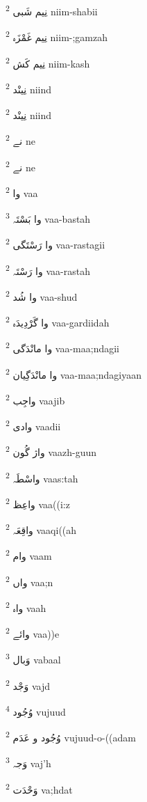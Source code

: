 \documentclass[12pt]{article}
\begin{document}
\begin{multicols}{5}
{\ur نِیم شَبی}   \textsuperscript{2} niim-shabii

{\ur نِیم غَمْزَہ}   \textsuperscript{2} niim-;gamzah

{\ur نِیم کَش}   \textsuperscript{2} niim-kash

{\ur نِینْد}   \textsuperscript{2} niind

{\ur نِینْد}   \textsuperscript{2} niind

{\ur نے}   \textsuperscript{2} ne

{\ur نے}   \textsuperscript{2} ne

{\ur وا}   \textsuperscript{2} vaa

{\ur وا بَسْتَہ}   \textsuperscript{3} vaa-bastah

{\ur وا رَسْتَگی}   \textsuperscript{2} vaa-rastagii

{\ur وا رَسْتَہ}   \textsuperscript{2} vaa-rastah

{\ur وا شُد}   \textsuperscript{2} vaa-shud

{\ur وا گَرْدِیدَہ}   \textsuperscript{2} vaa-gardiidah

{\ur وا مانْدَگی}   \textsuperscript{2} vaa-maa;ndagii

{\ur وا مانْدَگِیان}   \textsuperscript{2} vaa-maa;ndagiyaan

{\ur واجِب}   \textsuperscript{2} vaajib

{\ur وادی}   \textsuperscript{2} vaadii

{\ur واژ گُون}   \textsuperscript{2} vaazh-guun

{\ur واسْطَہ}   \textsuperscript{2} vaas:tah

{\ur واعِظ}   \textsuperscript{2} vaa((i:z

{\ur واقِعَہ}   \textsuperscript{2} vaaqi((ah

{\ur وام}   \textsuperscript{2} vaam

{\ur واں}   \textsuperscript{2} vaa;n

{\ur واہ}   \textsuperscript{2} vaah

{\ur وائے}   \textsuperscript{2} vaa))e

{\ur وَبال}   \textsuperscript{3} vabaal

{\ur وَجْد}   \textsuperscript{2} vajd

{\ur وُجُود}   \textsuperscript{4} vujuud

{\ur وُجُود و عَدَم}   \textsuperscript{2} vujuud-o-((adam

{\ur وَجہ}   \textsuperscript{3} vaj'h

{\ur وَحْدَت}   \textsuperscript{2} va;hdat


\end{multicols}
\end{document}
